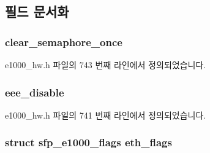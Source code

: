 \subsection{필드 문서화}
\subsubsection[{\texorpdfstring{clear\+\_\+semaphore\+\_\+once}{clear_semaphore_once}}]{ clear\+\_\+semaphore\+\_\+once}\hypertarget{structe1000__dev__spec__82575_a1a93b1f0a18379ceb74d60b361b5e564}{}\label{structe1000__dev__spec__82575_a1a93b1f0a18379ceb74d60b361b5e564}


e1000\+\_\+hw.\+h 파일의 743 번째 라인에서 정의되었습니다.

\subsubsection[{\texorpdfstring{eee\+\_\+disable}{eee_disable}}]{ eee\+\_\+disable}\hypertarget{structe1000__dev__spec__82575_a147d593355a5b316988a14544732b4a6}{}\label{structe1000__dev__spec__82575_a147d593355a5b316988a14544732b4a6}


e1000\+\_\+hw.\+h 파일의 741 번째 라인에서 정의되었습니다.

\subsubsection[{\texorpdfstring{eth\+\_\+flags}{eth_flags}}]{\setlength{\rightskip}{0pt plus 5cm}struct {\bf sfp\+\_\+e1000\+\_\+flags} eth\+\_\+flags}\hypertarget{structe1000__dev__spec__82575_a30d7f3a82680a372df6801c1ed86578a}{}\label{structe1000__dev__spec__82575_a30d7f3a82680a372df6801c1ed86578a}


